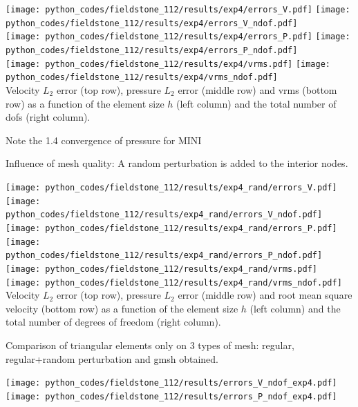 \begin{center}
\texttt{[image: python\_codes/fieldstone\_112/results/exp4/errors\_V.pdf]}
\texttt{[image: python\_codes/fieldstone\_112/results/exp4/errors\_V\_ndof.pdf]}\\
\texttt{[image: python\_codes/fieldstone\_112/results/exp4/errors\_P.pdf]}
\texttt{[image: python\_codes/fieldstone\_112/results/exp4/errors\_P\_ndof.pdf]}\\
\texttt{[image: python\_codes/fieldstone\_112/results/exp4/vrms.pdf]}
\texttt{[image: python\_codes/fieldstone\_112/results/exp4/vrms\_ndof.pdf]}\\
{\captionfont Velocity $L_2$ error (top row), pressure $L_2$ error (middle row) and vrms (bottom row) 
as a function of the element size $h$ (left column) and the total number of dofs (right column).}
\end{center}

Note the 1.4 convergence of pressure for MINI

\newpage
Influence of mesh quality: A random perturbation is added to the interior nodes. 

\begin{center}
\texttt{[image: python\_codes/fieldstone\_112/results/exp4\_rand/errors\_V.pdf]}
\texttt{[image: python\_codes/fieldstone\_112/results/exp4\_rand/errors\_V\_ndof.pdf]}\\
\texttt{[image: python\_codes/fieldstone\_112/results/exp4\_rand/errors\_P.pdf]}
\texttt{[image: python\_codes/fieldstone\_112/results/exp4\_rand/errors\_P\_ndof.pdf]}\\
\texttt{[image: python\_codes/fieldstone\_112/results/exp4\_rand/vrms.pdf]}
\texttt{[image: python\_codes/fieldstone\_112/results/exp4\_rand/vrms\_ndof.pdf]}\\
{\captionfont Velocity $L_2$ error (top row), pressure $L_2$ error (middle row) and root
mean square velocity (bottom row) as a function of the element size $h$ (left column) 
and the total number of degrees of freedom (right column).}
\end{center}


\newpage
Comparison of triangular elements only on 3 types of mesh: regular, regular+random perturbation 
and gmsh obtained.

\begin{center}
\texttt{[image: python\_codes/fieldstone\_112/results/errors\_V\_ndof\_exp4.pdf]}\\
\texttt{[image: python\_codes/fieldstone\_112/results/errors\_P\_ndof\_exp4.pdf]}
\end{center}



